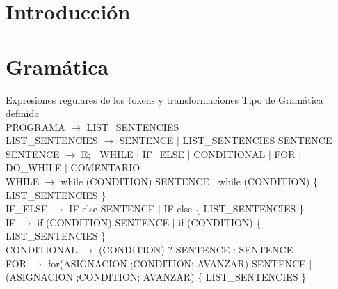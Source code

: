 \documentclass[10pt,a4paper]{article}
\begin{document}

\fecha{\today}



\maketitle

\tableofcontents

\newpage
\section{Introducción}

\section{Gramática}
Expresiones regulares de los tokens y transformaciones
Tipo de Gramática definida \\


PROGRAMA $\rightarrow$ LIST\_SENTENCIES \\

LIST\_SENTENCIES $\rightarrow$ SENTENCE $|$ LIST\_SENTENCIES SENTENCE \\

SENTENCE $\rightarrow$ E; $|$ WHILE $|$ IF\_ELSE $|$ CONDITIONAL $|$ FOR $|$ DO\_WHILE $|$ COMENTARIO \\

WHILE $\rightarrow$ while (CONDITION) SENTENCE $|$ while (CONDITION) \{ LIST\_SENTENCIES \} \\

IF\_ELSE $\rightarrow$ IF else SENTENCE $|$ IF else \{ LIST\_SENTENCIES \} \\

IF $\rightarrow$ if (CONDITION) SENTENCE $|$ if (CONDITION) \{ LIST\_SENTENCIES \} \\

CONDITIONAL $\rightarrow$ (CONDITION) ? SENTENCE : SENTENCE \\

FOR $\rightarrow$ for(ASIGNACION ;CONDITION; AVANZAR) SENTENCE $|$ (ASIGNACION ;CONDITION; AVANZAR) \{ LIST\_SENTENCIES \} \\
\end{document}
